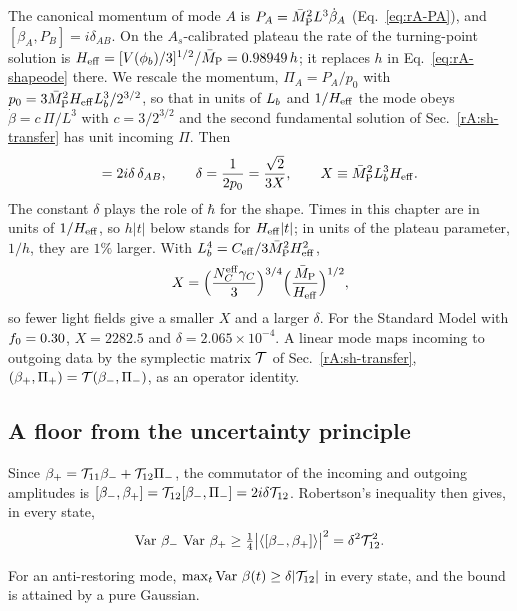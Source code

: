 The canonical momentum of mode $A$ is $P_A=\bar M_{\mathrm{P}}^2L^3\dot\beta_A$ (Eq.~\eqref{eq:rA-PA}), and $[\beta_A,P_B]=i\delta_{AB}$.
On the $A_s$-calibrated plateau the rate of the turning-point solution is $H_{\mathrm{eff}}=[V(\phi_b)/3]^{1/2}/\bar M_{\mathrm{P}}=0.98949\,h$; it replaces $h$ in Eq.~\eqref{eq:rA-shapeode} there. %
We rescale the momentum, $\Pi_A=P_A/p_0$ with $p_0=3\bar M_{\mathrm{P}}^2H_{\mathrm{eff}}L_b^3/2^{3/2}$, so that in units of $L_b$ and $1/H_{\mathrm{eff}}$ the mode obeys $\dot\beta=c\,\Pi/L^3$ with $c=3/2^{3/2}$ and the second fundamental solution of Sec.~\ref{rA:sh-transfer} has unit incoming $\Pi$.
Then
\begin{equation}
[\beta_A,\Pi_B]=2i\delta\,\delta_{AB},\qquad
\delta=\frac{1}{2p_0}=\frac{\sqrt2}{3X},\qquad X\equiv\MPbar^2\Lb^3\rAHeff .
\label{eq:rA-delta}
\end{equation}
The constant $\delta$ plays the role of $\hbar$ for the shape.
Times in this chapter are in units of $1/H_{\mathrm{eff}}$, so $h|t|$ below stands for $H_{\mathrm{eff}}|t|$; in units of the plateau parameter, $1/h$, they are $1\%$ larger. %
With $L_b^4=C_{\rm eff}/3\bar M_{\mathrm{P}}^2H_{\mathrm{eff}}^2$,
\begin{equation}
X=\Big(\frac{N_C^{\mathrm{eff}}\gamma_C}{3}\Big)^{3/4}\Big(\frac{\bar M_{\mathrm{P}}}{H_{\mathrm{eff}}}\Big)^{1/2},
\end{equation}
so fewer light fields give a smaller $X$ and a larger $\delta$.
For the Standard Model with $f_0=0.30$, $X=2282.5$ and $\delta=2.065\times10^{-4}$. %
A linear mode maps incoming to outgoing data by the symplectic matrix $\mathcal{T}$ of Sec.~\ref{rA:sh-transfer}, $(\beta_+,\Pi_+)=\mathcal{T}(\beta_-,\Pi_-)$, as an operator identity.

\subsection{A floor from the uncertainty principle}
\label{rA:s-floor}

Since $\beta_+=\mathcal{T}_{11}\beta_-+\mathcal{T}_{12}\Pi_-$, the commutator of the incoming and outgoing amplitudes is $[\beta_-,\beta_+]=\mathcal{T}_{12}[\beta_-,\Pi_-]=2i\delta\mathcal{T}_{12}$.
Robertson's inequality then gives, in every state,
\begin{equation}
\operatorname{Var}\,\beta_-\,\operatorname{Var}\,\beta_+\geq\tfrac14\big|\langle[\beta_-,\beta_+]\rangle\big|^2=\delta^2\mathcal{T}_{12}^2 .
\end{equation}

\begin{rAlemma}\label{lem:rA-alltime}
For an anti-restoring mode, $\max_t\operatorname{Var}\,\beta(t)\geq\delta|\mathcal{T}_{12}|$ in every state, and the bound is attained by a pure Gaussian.
\end{rAlemma}

